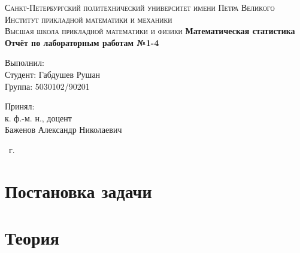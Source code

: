 \documentclass[14pt,a4paper,article]{ncc}
\begin{document}
\begin{titlepage}
    \begin{center}
        \textsc{
            Санкт-Петербургский политехнический университет имени Петра Великого \\[5mm]
            Институт прикладной математики и механики\\[2mm]
            Высшая школа прикладной математики и физики            
        }   
        \vfill
        \textbf{\large
            Математическая статистика\\
            Отчёт по лабораторным работам №1-4 \\[3mm]
        }                
    \end{center}

    \vfill
    \hfill
    \begin{minipage}{0.5\textwidth}
        Выполнил: \\[2mm]   
		Студент: Габдушев Рушан \\
		Группа: 5030102/90201\\
    \end{minipage}

	\hfill
	\begin{minipage}{0.5\textwidth}
		Принял: \\[2mm]
		к. ф.-м. н., доцент \\   
		Баженов Александр Николаевич
	\end{minipage}

    \vfill
    \begin{center}
        \theyear\ г.
    \end{center}
\end{titlepage}

\tableofcontents
\newpage
\listoffigures
\newpage
\listoftables
\newpage

\section{Постановка задачи}
\label{sec:problem}

\begin{enumerate}





\end{enumerate}
\newpage

\section{Теория}
\label{sec:theory}






\newpage
\end{document}
